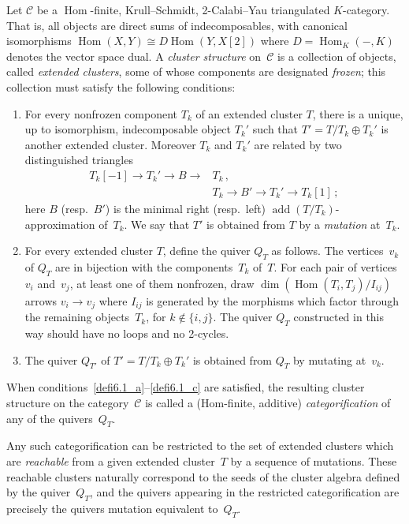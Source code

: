 \documentclass[ALCO,ThmDefs,Unicode,epreuves,published]{cedram}
\DeclareMathOperator{\Hom}{Hom}
\DeclareMathOperator{\add}{add}
\begin{document}
\begin{definition}
\label{def:BIRSc}
Let $\mathcal C$ be a $\Hom$-finite, Krull--Schmidt, 2-Calabi--Yau triangulated $K$-category. 
That is, all objects are direct sums of indecomposables, with canonical isomorphisms 
$\Hom(X,Y)\cong D\!\Hom (Y,X[2])$
where $D\!=\!\Hom _K(-,K)$ denotes the vector space dual. 
A \emph{cluster structure} on~$\mathcal C$ is a collection of 
objects, called \emph{extended clusters}, some of whose components are designated \emph{frozen}; this collection must satisfy the following conditions:

\begin{enumerate}[label=(\alph*)]
\item\label{defi6.1_a} 
For every nonfrozen component $T_k$ of an extended cluster $T$, there is a unique, up to isomorphism, indecomposable object $T_k'$ such that $T'=T/T_k\oplus T_k'$ is another extended cluster. 
Moreover $T_k$ and $T_k'$ are related by two distinguished triangles
\[
\begin{aligned}
T_k[-1]\to T_k'\to B\to &T_k \,, \\
&T_k\to B'\to T_k'\to T_k[1] \,;
\end{aligned}
\]
here $B$ (resp.~$B'$) is the minimal right (resp.~left) $\add (T/T_k)$-approximation of~$T_k$.
We say that $T'$ is obtained from $T$ by a \emph{mutation} at~$T_k$. 


\item\label{defi6.1_b} 
For every extended cluster $T$, define the quiver $Q_T$ as follows. 
The vertices~$v_k$ of $Q_T$ are in bijection with the components~$T_k$ of~$T$.
For each pair of vertices $v_i$ and~$v_j$, 
at least one of them nonfrozen, 
draw $\dim(\Hom(T_i,T_j)/I_{ij})$ arrows $v_i\to v_j$
where $I_{ij}$ is generated by the morphisms which factor through the remaining objects~$T_k$,
for $k\notin\{i,j\}$. 
The quiver $Q_T$ constructed in this way should have no loops and no 2-cycles. 

\item\label{defi6.1_c} 
The quiver $Q_{T'}$ of $T'=T/T_k\oplus T_k'$ is obtained from $Q_T$ by mutating at~$v_k$.
\end{enumerate}
When conditions~\ref{defi6.1_a}--\ref{defi6.1_c} are satisfied, the resulting cluster structure on the category~$\mathcal{C}$
is called a (Hom-finite, additive) \emph{categorification} of any of the quivers~$Q_T$.

Any such categorification can be restricted to the set of extended clusters which are \emph{reachable} from a given extended cluster~$T$ by a sequence of mutations. 
These reachable clusters naturally correspond to the seeds of the cluster algebra defined by the quiver~$Q_T$, and 
the quivers appearing in the restricted categorification 
are precisely the quivers mutation equivalent to~$Q_T$. 
\end{definition}
\end{document}
